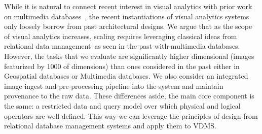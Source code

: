 While it is natural to connect recent interest in visual analytics with prior work on multimedia databases~\cite{yoshitaka1999survey}, the recent instantiations of visual analytics systems only loosely borrow from past architectural designs.
We argue that as the scope of  visual analytics increases, scaling requires leveraging classical ideas from relational data management--as seen in the past with multimedia databases.
However, the tasks that we evaluate are significantly higher dimensional (images featurized by 1000 of dimensions) than ones considered in the past either in Geospatial databases or Multimedia databases.
We also consider an integrated image ingest and pre-processing pipeline into the system and maintain provenance to the raw data. 
These differences aside, the main core component is the same: a restricted data and query model over which physical and logical operators are well defined.
This way we can leverage the principles of design from relational database management systems and apply them to VDMS.










